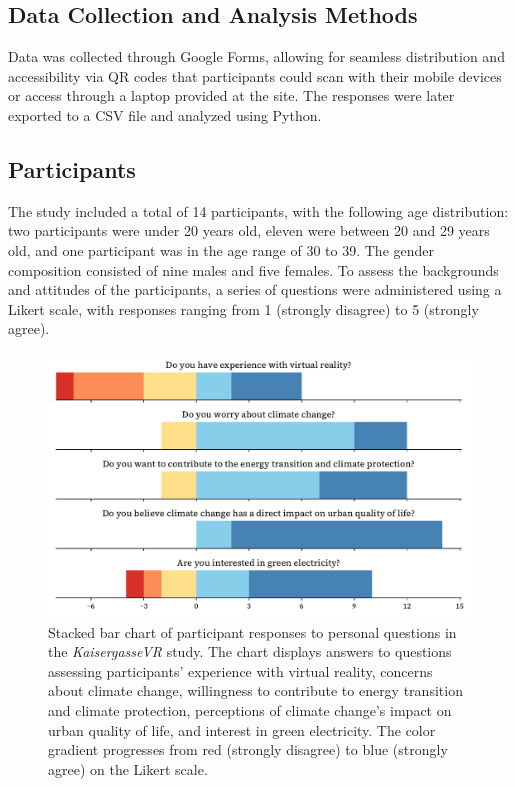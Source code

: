 \documentclass[draft, final]{vutinfth} %
\begin{document}
\subsection{Data Collection and Analysis Methods}

Data was collected through Google Forms, allowing for seamless distribution and accessibility via QR codes that participants could scan with their mobile devices or access through a laptop provided at the site. The responses were later exported to a CSV file and analyzed using Python.

\subsection{Participants}

The study included a total of 14 participants, with the following age distribution: two participants were under 20 years old, eleven were between 20 and 29 years old, and one participant was in the age range of 30 to 39. The gender composition consisted of nine males and five females. To assess the backgrounds and attitudes of the participants, a series of questions were administered using a Likert scale, with responses ranging from 1 (strongly disagree) to 5 (strongly agree).

\begin{figure}[h]
    \centering
    \includegraphics[width=\textwidth]{graphics/participants-kaisergasse.pdf}
    \caption{Stacked bar chart of participant responses to personal questions in the \textit{KaisergasseVR} study. The chart displays answers to questions assessing participants' experience with virtual reality, concerns about climate change, willingness to contribute to energy transition and climate protection, perceptions of climate change's impact on urban quality of life, and interest in green electricity. The color gradient progresses from red (strongly disagree) to blue (strongly agree) on the Likert scale.}
    \label{fig:participants_kaisergasse}
\end{figure}
\end{document}
